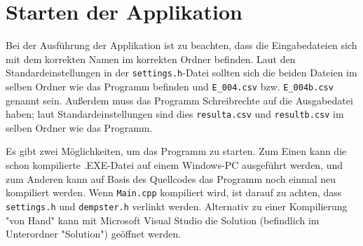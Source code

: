 \chapter{Starten der Applikation}
Bei der Ausführung der Applikation ist zu beachten, dass die Eingabedateien sich mit dem korrekten Namen im korrekten Ordner befinden. Laut den Standardeinstellungen in der \verb|settings.h|-Datei sollten sich die beiden Dateien im selben Ordner wie das Programm befinden und \verb|E_004.csv| bzw. \verb|E_004b.csv| genannt sein. Außerdem muss das Programm Schreibrechte auf die Ausgabedatei haben; laut Standardeinstellungen sind dies \verb|resulta.csv| und \verb|resultb.csv| im selben Ordner wie das Programm.

Es gibt zwei Möglichkeiten, um das Programm zu starten. Zum Einen kann die schon kompilierte .EXE-Datei auf einem Windows-PC ausgeführt werden, und zum Anderen kann auf Basis des Quellcodes das Programm noch einmal neu kompiliert werden. Wenn \verb|Main.cpp| kompiliert wird, ist darauf zu achten, dass \verb|settings.h| und \verb|dempster.h| verlinkt werden. Alternativ zu einer Kompilierung "von Hand" kann mit Microsoft Visual Studio die Solution (befindlich im Unterordner "Solution") geöffnet werden.
